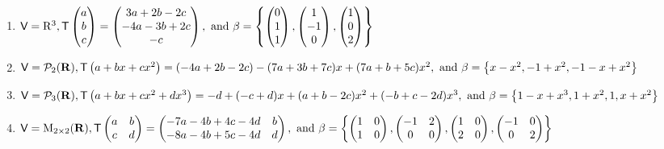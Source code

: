\begin{exercise}
\begin{enumerate}
\item
\(
    \textsf{V}=\mathrm{R}^{3}, \textsf{T}\begin{pmatrix}a \\ b \\ c\end{pmatrix}=\begin{pmatrix}3 a+2 b-2 c \\ -4 a-3 b+2 c \\ -c\end{pmatrix},
    \text{ and } \\
    \beta=\left\{
        \begin{pmatrix} 0 \\ 1 \\ 1 \end{pmatrix},
        \begin{pmatrix} 1 \\ -1 \\ 0 \end{pmatrix},
        \begin{pmatrix} 1 \\ 0 \\ 2 \end{pmatrix}
    \right\}
\)

\item
\(
    \textsf{V}=\mathcal{P}_{2}(\mathbf{R}), \textsf{T}\left(a+b x+c x^{2}\right)=  (-4 a+2 b-2 c)-(7 a+3 b+7 c) x+(7 a+b+5 c) x^{2},
    \text{ and } \\
    \beta=\left\{ x-x^{2},-1+x^{2},-1-x+x^{2}\right\}
\)

\item
\(
    \textsf{V}=\mathcal{P}_{3}(\mathbf{R}), \\
    \textsf{T}\left(a+b x+c x^{2}+d x^{3}\right) = -d+(-c+d) x+(a+b-2 c) x^{2}+(-b+c-2 d) x^{3}, \\
    \text{ and }
    \beta=\left\{1-x+x^{3}, 1+x^{2}, 1, x+x^{2}\right\}
\)

\item
\(
    \textsf{V}=\mathrm{M}_{2 \times 2}(\mathbf{R}), \textsf{T}\begin{pmatrix}a & b \\ c & d\end{pmatrix}=\begin{pmatrix}-7 a-4 b+4 c-4 d & b \\ -8 a-4 b+5 c-4 d & d\end{pmatrix}, \\
    \text{ and }
    \beta=\left\{
        \begin{pmatrix} 1 & 0 \\ 1 & 0 \end{pmatrix},
        \begin{pmatrix} -1 & 2 \\ 0 & 0 \end{pmatrix},
        \begin{pmatrix} 1 & 0 \\ 2 & 0 \end{pmatrix},
        \begin{pmatrix} -1 & 0 \\ 0 & 2 \end{pmatrix}
    \right\}
\)
\end{enumerate}
\end{exercise}

